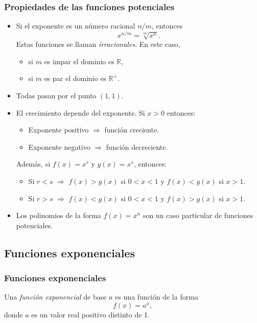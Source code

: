 \begin{frame}
\frametitle{Propiedades de las funciones potenciales}
\begin{itemize}
\item Si el exponente es un número racional $n/m$, entonces 
\[x^{n/m}=\sqrt[m]{x^n}.\]
Estas funciones se llaman \emph{irracionales}. En este caso, 
\begin{itemize}
\item si $m$ es impar el dominio es $\mathbb{R}$,
\item si $m$ es par el dominio es $\mathbb{R}^+$.
\end{itemize}
\item Todas pasan por el punto $(1,1)$.
\item El crecimiento depende del exponente. Si $x>0$ entonces:
\begin{itemize}
\item Exponente positivo $\Rightarrow$ función creciente.
\item Exponente negativo $\Rightarrow$ función decreciente. 
\end{itemize}
Además, si $f(x)=x^r$ y $g(x)=x^s$, entonces:
\begin{itemize}
\item Si $r<s$ $\Rightarrow$ $f(x)>g(x)$ si $0<x<1$ y $f(x)<g(x)$ si $x>1$.
\item Si $r>s$ $\Rightarrow$ $f(x)<g(x)$ si $0<x<1$ y $f(x)>g(x)$ si $x>1$.
\end{itemize}

\item Los polinomios de la forma $f(x)=x^n$ son un caso particular de funciones potenciales. 
\end{itemize}
\end{frame} 



\subsection{Funciones exponenciales}
\begin{frame}
\frametitle{Funciones exponenciales}
\begin{definicion}
Una \emph{función exponencial} de base $a$ es una función de la forma
\[
f(x)=a^x,
\]
donde $a$ es un valor real positivo distinto de 1.
\end{definicion}
\begin{center}
\scalebox{1}{}
\end{center}
\end{frame} 


